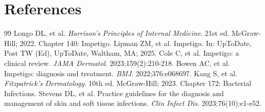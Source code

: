 \section*{References}

\begin{thebibliography}{99}
 Longo DL, et al. \emph{Harrison's Principles of Internal Medicine}. 21st ed. McGraw-Hill; 2022. Chapter 140: Impetigo.
 Lipman ZM, et al. Impetigo. In: UpToDate, Post TW (Ed), UpToDate, Waltham, MA; 2025.
 Cole C, et al. Impetigo: a clinical review. \emph{JAMA Dermatol}. 2023;159(2):210-218.
 Bowen AC, et al. Impetigo: diagnosis and treatment. \emph{BMJ}. 2022;376:e068697.
 Kang S, et al. \emph{Fitzpatrick's Dermatology}. 10th ed. McGraw-Hill; 2023. Chapter 172: Bacterial Infections.
 Stevens DL, et al. Practice guidelines for the diagnosis and management of skin and soft tissue infections. \emph{Clin Infect Dis}. 2023;76(10):e1-e52.
\end{thebibliography}
